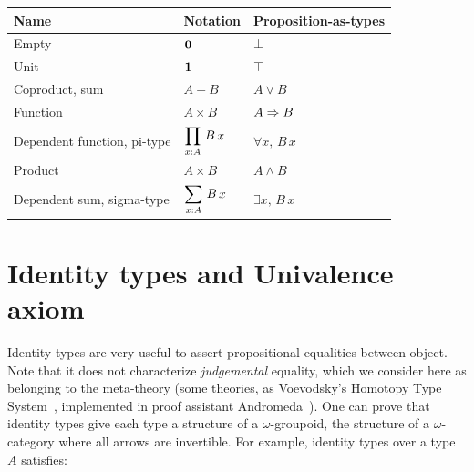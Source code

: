 \renewcommand{\arraystretch}{2}
\begin{tabular}{|l|l|l|}
  \hline
  Name & Notation & Proposition-as-types \\
  \hline\hline
  Empty & $\displaystyle{\mathbf{0}}$ & $\displaystyle{\bot}$ \\
  \hline
  Unit & $\displaystyle{\mathbf{1}}$ & $\displaystyle{\top}$ \\
  \hline
  Coproduct, sum & $\displaystyle{A+B}$ & $\displaystyle{A\lor B}$ \\
  \hline
  Function & $\displaystyle{A\times B}$ & $\displaystyle{A\Rightarrow B}$ \\
  \hline
  Dependent function, pi-type & $\displaystyle{\prod_{x:A}\, B\, x}$ & $\displaystyle{\forall x,\,
                                                       B\, x}$ \\
  \hline
  Product & $\displaystyle{A\times B}$ & $\displaystyle{A\land B}$ \\
  \hline
  Dependent sum, sigma-type & $\displaystyle{\sum_{x:A}\, B\, x}$ & $\displaystyle{\exists x,\, B\,
                                                    x}$ \\
  \hline
\end{tabular}
\renewcommand{\arraystretch}{1}

\section{Identity types and Univalence axiom}
\label{sec:ua}

Identity types are very useful to assert propositional equalities
between object. Note that it does not characterize {\em judgemental}
equality, which we consider here as belonging to the meta-theory (some
theories, as Voevodsky's Homotopy Type System~\cite{hts}, implemented
in proof assistant Andromeda~\cite{andromeda}). 
One can prove that identity types give each type a structure of a
$\omega$-groupoid, \ie{} the structure of a $\omega$-category where
all arrows are invertible. For example, identity types over a type $A$
satisfies:

